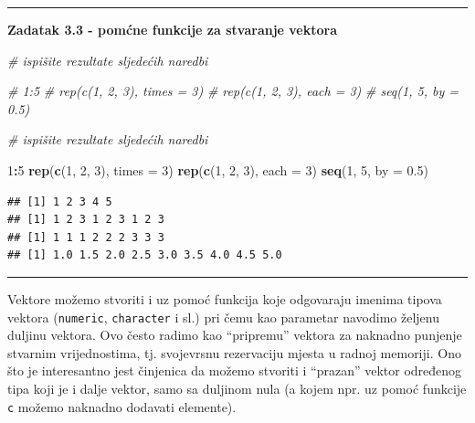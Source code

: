 \documentclass[]{book}
\newenvironment{Shaded}{\begin{snugshade}}{\end{snugshade}}
\newcommand{\KeywordTok}[1]{\textcolor[rgb]{0.13,0.29,0.53}{\textbf{#1}}}
\newcommand{\DataTypeTok}[1]{\textcolor[rgb]{0.13,0.29,0.53}{#1}}
\newcommand{\DecValTok}[1]{\textcolor[rgb]{0.00,0.00,0.81}{#1}}
\newcommand{\FloatTok}[1]{\textcolor[rgb]{0.00,0.00,0.81}{#1}}
\newcommand{\CommentTok}[1]{\textcolor[rgb]{0.56,0.35,0.01}{\textit{#1}}}
\newcommand{\OperatorTok}[1]{\textcolor[rgb]{0.81,0.36,0.00}{\textbf{#1}}}
\newcommand{\NormalTok}[1]{#1}
\theoremstyle{definition}
\theoremstyle{definition}
\theoremstyle{definition}
\theoremstyle{remark}
\begin{document}
\begin{center}\rule{0.5\linewidth}{\linethickness}\end{center}

\textbf{Zadatak 3.3 - pomćne funkcije za stvaranje vektora}

\begin{Shaded}
\begin{Highlighting}[]
\CommentTok{# ispišite rezultate sljedećih naredbi}

\CommentTok{# 1:5}
\CommentTok{# rep(c(1, 2, 3), times = 3)}
\CommentTok{# rep(c(1, 2, 3), each = 3)}
\CommentTok{# seq(1, 5, by = 0.5)}
\end{Highlighting}
\end{Shaded}

\begin{Shaded}
\begin{Highlighting}[]
\CommentTok{# ispišite rezultate sljedećih naredbi}

\DecValTok{1}\OperatorTok{:}\DecValTok{5}
\KeywordTok{rep}\NormalTok{(}\KeywordTok{c}\NormalTok{(}\DecValTok{1}\NormalTok{, }\DecValTok{2}\NormalTok{, }\DecValTok{3}\NormalTok{), }\DataTypeTok{times =} \DecValTok{3}\NormalTok{)}
\KeywordTok{rep}\NormalTok{(}\KeywordTok{c}\NormalTok{(}\DecValTok{1}\NormalTok{, }\DecValTok{2}\NormalTok{, }\DecValTok{3}\NormalTok{), }\DataTypeTok{each =} \DecValTok{3}\NormalTok{)}
\KeywordTok{seq}\NormalTok{(}\DecValTok{1}\NormalTok{, }\DecValTok{5}\NormalTok{, }\DataTypeTok{by =} \FloatTok{0.5}\NormalTok{)}
\end{Highlighting}
\end{Shaded}

\begin{verbatim}
## [1] 1 2 3 4 5
## [1] 1 2 3 1 2 3 1 2 3
## [1] 1 1 1 2 2 2 3 3 3
## [1] 1.0 1.5 2.0 2.5 3.0 3.5 4.0 4.5 5.0
\end{verbatim}

\begin{center}\rule{0.5\linewidth}{\linethickness}\end{center}

Vektore možemo stvoriti i uz pomoć funkcija koje odgovaraju imenima
tipova vektora (\texttt{numeric}, \texttt{character} i sl.) pri čemu kao
parametar navodimo željenu duljinu vektora. Ovo često radimo kao
``pripremu'' vektora za naknadno punjenje stvarnim vrijednostima, tj.
svojevrsnu rezervaciju mjesta u radnoj memoriji. Ono što je interesantno
jest činjenica da možemo stvoriti i ``prazan'' vektor određenog tipa
koji je i dalje vektor, samo sa duljinom nula (a kojem npr. uz pomoć
funkcije \texttt{c} možemo naknadno dodavati elemente).
\end{document}
